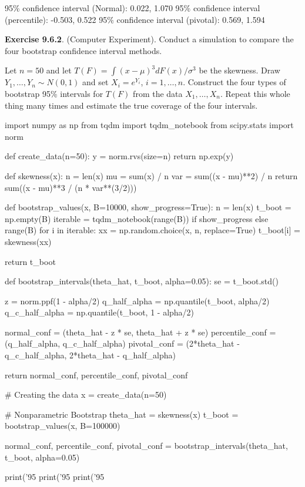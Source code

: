 \begin{console}
95\% confidence interval (Normal):        0.022, 1.070
95\% confidence interval (percentile):    -0.503, 0.522
95\% confidence interval (pivotal):       0.569, 1.594
\end{console}

\textbf{Exercise 9.6.2}. (Computer Experiment). Conduct a simulation to
compare the four bootstrap confidence interval methods.

Let \(n = 50\) and let \(T(F) = \int (x - \mu)^{3} dF(x) / \sigma^{3}\) be
the skewness. Draw \(Y_{1}, \dots, Y_{n} \sim N(0, 1)\) and set
\(X_{i} = e^{Y_{i}}\), \(i = 1, \dots, n\). Construct the four types of
bootstrap 95\% intervals for \(T(F)\) from the data \(X_{1}, \dots, X_{n}\).
Repeat this whole thing many times and estimate the true coverage of the
four intervals.

\begin{python}
import numpy as np
from tqdm import tqdm_{n}otebook
from scipy.stats import norm

def create_data(n=50):
    y = norm.rvs(size=n)
    return np.exp(y)

def skewness(x):
    n = len(x)
    mu = sum(x) / n
    var = sum((x - mu)**2) / n
    return sum((x - mu)**3 / (n * var**(3/2)))

def bootstrap_values(x, B=10000, show_progress=True):
    n = len(x)
    t_boot = np.empty(B)
    iterable = tqdm_{n}otebook(range(B)) if show_progress else range(B)
    for i in iterable:
        xx = np.random.choice(x, n, replace=True)
        t_boot[i] = skewness(xx)

    return t_boot

def bootstrap_{i}ntervals(theta_hat, t_boot, alpha=0.05):
    se = t_boot.std()
    
    z = norm.ppf(1 - alpha/2)
    q_half_alpha = np.quantile(t_boot, alpha/2)
    q_c_half_alpha = np.quantile(t_boot, 1 - alpha/2)

    normal_conf = (theta_hat - z * se, theta_hat + z * se)
    percentile_conf = (q_half_alpha, q_c_half_alpha)
    pivotal_conf = (2*theta_hat - q_c_half_alpha, 2*theta_hat - q_half_alpha)
    
    return normal_conf, percentile_conf, pivotal_conf
\end{python}

\begin{python}
# Creating the data
x = create_data(n=50)

# Nonparametric Bootstrap
theta_hat = skewness(x)
t_boot = bootstrap_values(x, B=100000)

normal_conf, percentile_conf, pivotal_conf = bootstrap_{i}ntervals(theta_hat, t_boot, alpha=0.05)

print('95%
print('95%
print('95%
\end{python}

